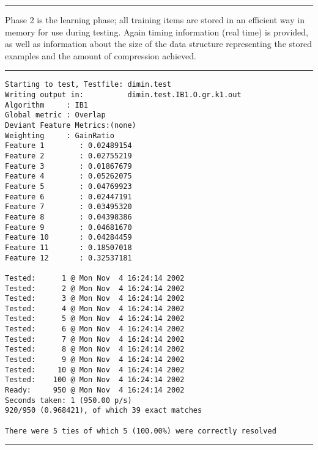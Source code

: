 \documentclass{report}
\begin{document}
\rule{\textwidth}{0.5mm}

\vspace{1cm}

Phase 2 is the learning phase; all training items are stored in an
efficient way in memory for use during testing. Again timing
information (real time) is provided, as well as information about the
size of the data structure representing the stored examples and the
amount of compression achieved. 

\vspace{1cm}

\rule{\textwidth}{0.5mm}

{\small
\begin{verbatim}
Starting to test, Testfile: dimin.test
Writing output in:          dimin.test.IB1.O.gr.k1.out
Algorithm     : IB1
Global metric : Overlap
Deviant Feature Metrics:(none)
Weighting     : GainRatio
Feature 1        : 0.02489154
Feature 2        : 0.02755219
Feature 3        : 0.01867679
Feature 4        : 0.05262075
Feature 5        : 0.04769923
Feature 6        : 0.02447191
Feature 7        : 0.03495320
Feature 8        : 0.04398386
Feature 9        : 0.04681670
Feature 10       : 0.04284459
Feature 11       : 0.18507018
Feature 12       : 0.32537181

Tested:      1 @ Mon Nov  4 16:24:14 2002
Tested:      2 @ Mon Nov  4 16:24:14 2002
Tested:      3 @ Mon Nov  4 16:24:14 2002
Tested:      4 @ Mon Nov  4 16:24:14 2002
Tested:      5 @ Mon Nov  4 16:24:14 2002
Tested:      6 @ Mon Nov  4 16:24:14 2002
Tested:      7 @ Mon Nov  4 16:24:14 2002
Tested:      8 @ Mon Nov  4 16:24:14 2002
Tested:      9 @ Mon Nov  4 16:24:14 2002
Tested:     10 @ Mon Nov  4 16:24:14 2002
Tested:    100 @ Mon Nov  4 16:24:14 2002
Ready:     950 @ Mon Nov  4 16:24:14 2002
Seconds taken: 1 (950.00 p/s)
920/950 (0.968421), of which 39 exact matches

There were 5 ties of which 5 (100.00%) were correctly resolved
\end{verbatim}
}

\rule{\textwidth}{0.5mm}

\vspace{1cm}
\end{document}
